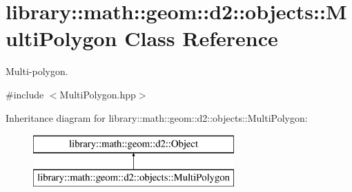 \hypertarget{classlibrary_1_1math_1_1geom_1_1d2_1_1objects_1_1_multi_polygon}{}\section{library\+:\+:math\+:\+:geom\+:\+:d2\+:\+:objects\+:\+:Multi\+Polygon Class Reference}
\label{classlibrary_1_1math_1_1geom_1_1d2_1_1objects_1_1_multi_polygon}


Multi-\/polygon.  




{\ttfamily \#include $<$Multi\+Polygon.\+hpp$>$}

Inheritance diagram for library\+:\+:math\+:\+:geom\+:\+:d2\+:\+:objects\+:\+:Multi\+Polygon\+:\begin{figure}[H]
\begin{center}
\leavevmode
\includegraphics[height=2.000000cm]{classlibrary_1_1math_1_1geom_1_1d2_1_1objects_1_1_multi_polygon}
\end{center}
\end{figure}
